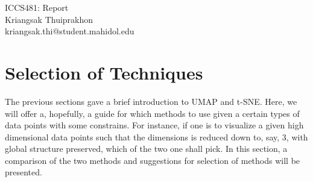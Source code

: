 \documentclass[a4paper, 11pt]{article}
\makeatletter
\newcommand{\myname}{Kriangsak Thuiprakhon}
\newcommand{\myemail}{kriangsak.thi@student.mahidol.edu}
\newcommand{\myhwnum}{}
\makeatother
\begin{document}
\medskip                        %

\thispagestyle{plain}
\begin{center}                  %
{\Large ICCS481: Report \myhwnum} \\
\myname \\
\myemail \\
\end{center}

	
\section{Selection of Techniques}
The previous sections gave a brief introduction to UMAP and t-SNE. Here, we will offer a, hopefully, a guide for which methods to use given a certain types of data points with some constrains. For instance, if one is to visualize a given high dimensional data points such that the dimensions is reduced down to, say, 3, with global structure preserved, which of the two one shall pick. In this section, a comparison of the two methods and suggestions for selection of methods will be presented.  
\end{document}
